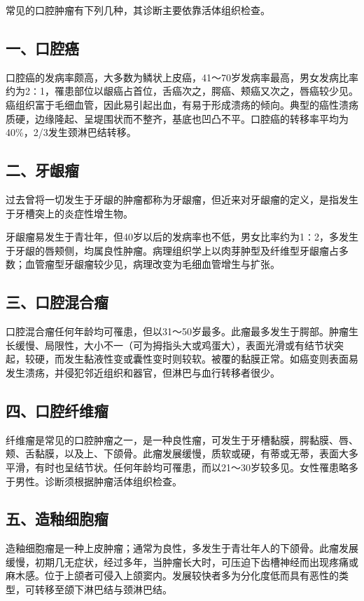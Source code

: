 常见的口腔肿瘤有下列几种，其诊断主要依靠活体组织检查。

\subsection{一、口腔癌}

口腔癌的发病率颇高，大多数为鳞状上皮癌，41～70岁发病率最高，男女发病比率约为2∶1，罹患部位以龈癌占首位，舌癌次之，腭癌、颊癌又次之，唇癌较少见。癌组织富于毛细血管，因此易引起出血，有易于形成溃疡的倾向。典型的癌性溃疡质硬，边缘隆起、呈堤围状而不整齐，基底也凹凸不平。口腔癌的转移率平均为40\%，2/3发生颈淋巴结转移。

\subsection{二、牙龈瘤}

过去曾将一切发生于牙龈的肿瘤都称为牙龈瘤，但近来对牙龈瘤的定义，是指发生于牙槽突上的炎症性增生物。

牙龈瘤易发生于青壮年，但40岁以后的发病率也不低，男女比率约为1∶2，多发生于牙龈的唇颊侧，均属良性肿瘤。病理组织学上以肉芽肿型及纤维型牙龈瘤占多数；血管瘤型牙龈瘤较少见，病理改变为毛细血管增生与扩张。

\subsection{三、口腔混合瘤}

口腔混合瘤任何年龄均可罹患，但以31～50岁最多。此瘤最多发生于腭部。肿瘤生长缓慢、局限性，大小不一（可为拇指头大或鸡蛋大），表面光滑或有结节状突起，较硬，而发生黏液性变或囊性变时则较软。被覆的黏膜正常。如癌变则表面易发生溃疡，并侵犯邻近组织和器官，但淋巴与血行转移者很少。

\subsection{四、口腔纤维瘤}

纤维瘤是常见的口腔肿瘤之一，是一种良性瘤，可发生于牙槽黏膜，腭黏膜、唇、颊、舌黏膜，以及上、下颌骨。此瘤发展缓慢，质软或硬，有蒂或无蒂，表面大多平滑，有时也呈结节状。任何年龄均可罹患，而以21～30岁较多见。女性罹患略多于男性。诊断须根据肿瘤活体组织检查。

\subsection{五、造釉细胞瘤}

造釉细胞瘤是一种上皮肿瘤；通常为良性，多发生于青壮年人的下颌骨。此瘤发展缓慢，初期几无症状，经过多年，当肿瘤长大时，可压迫下齿槽神经而出现疼痛或麻木感。位于上颌者可侵入上颌窦内。发展较快者多为分化度低而具有恶性的类型，可转移至颌下淋巴结与颈淋巴结。

